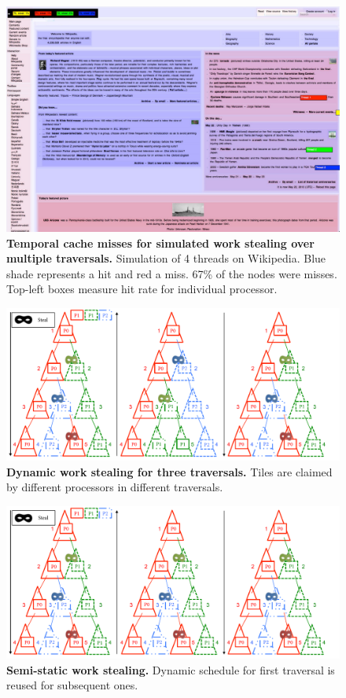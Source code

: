 \begin{figure}
\centering
\includegraphics[width=1.0\columnwidth]{chapter6/workstealdelta}
\caption{\textbf{Temporal cache misses for simulated work stealing over multiple traversals.} Simulation of 4 threads on Wikipedia. Blue shade represents a hit and red a miss. 67\% of the nodes were misses. Top-left boxes measure hit rate for individual processor.}
\label{fig:wswikipediadelta}
\end{figure}

\begin{figure}
\centering
\includegraphics[width=1.0\columnwidth]{chapter6/wsbad}
\caption{\textbf{Dynamic work stealing for three traversals.} Tiles are claimed by different processors in different traversals.}
\label{fig:wsbad}
\end{figure}

\begin{figure}
\centering
\includegraphics[width=1.0\columnwidth]{chapter6/wsgood}
\caption{\textbf{Semi-static work stealing.} Dynamic schedule for first traversal is reused for subsequent ones.}
\label{fig:wsgood}
\end{figure}



